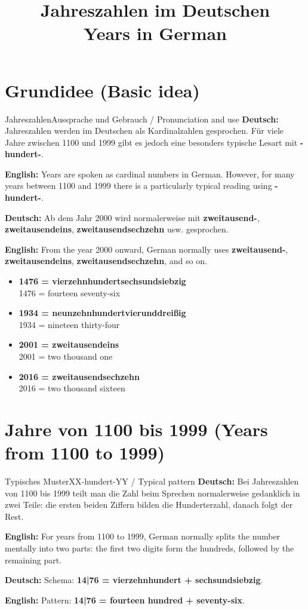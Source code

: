 \documentclass[a4paper,11pt]{article}
\title{Jahreszahlen im Deutschen\\\large \textnormal{Years in German}}
\date{}
\newcommand{\GermanText}[1]{\textbf{Deutsch: }#1\par}
\newcommand{\EnglishText}[1]{{\small\color{SoftGray}\textbf{English: }#1\par}}
\newcommand{\ExampleItem}[2]{\item \textbf{#1}\\{\small\color{SoftGray}#2}}
\begin{document}
\maketitle
\tableofcontents
\newpage

\section{Grundidee \textnormal{(Basic idea)}}

\begin{grammarentry}{Jahreszahlen}{Aussprache und Gebrauch / Pronunciation and use}
\GermanText{Jahreszahlen werden im Deutschen als Kardinalzahlen gesprochen. Für viele Jahre zwischen 1100 und 1999 gibt es jedoch eine besonders typische Lesart mit \textbf{-hundert-}.}
\EnglishText{Years are spoken as cardinal numbers in German. However, for many years between 1100 and 1999 there is a particularly typical reading using \textbf{-hundert-}.}

\GermanText{Ab dem Jahr 2000 wird normalerweise mit \textbf{zweitausend-}, \textbf{zweitausendeins}, \textbf{zweitausendsechzehn} usw. gesprochen.}
\EnglishText{From the year 2000 onward, German normally uses \textbf{zweitausend-}, \textbf{zweitausendeins}, \textbf{zweitausendsechzehn}, and so on.}
\end{grammarentry}

\begin{exbox}
\begin{itemize}
\ExampleItem{1476 = vierzehnhundertsechsundsiebzig}{1476 = fourteen seventy-six}
\ExampleItem{1934 = neunzehnhundertvierunddreißig}{1934 = nineteen thirty-four}
\ExampleItem{2001 = zweitausendeins}{2001 = two thousand one}
\ExampleItem{2016 = zweitausendsechzehn}{2016 = two thousand sixteen}
\end{itemize}
\end{exbox}

\section{Jahre von 1100 bis 1999 \textnormal{(Years from 1100 to 1999)}}

\begin{grammarentry}{Typisches Muster}{XX-hundert-YY / Typical pattern}
\GermanText{Bei Jahreszahlen von 1100 bis 1999 teilt man die Zahl beim Sprechen normalerweise gedanklich in zwei Teile: die ersten beiden Ziffern bilden die Hunderterzahl, danach folgt der Rest.}
\EnglishText{For years from 1100 to 1999, German normally splits the number mentally into two parts: the first two digits form the hundreds, followed by the remaining part.}

\GermanText{Schema: \textbf{14|76 = vierzehnhundert + sechsundsiebzig}.}
\EnglishText{Pattern: \textbf{14|76 = fourteen hundred + seventy-six}.}
\end{grammarentry}
\end{document}
